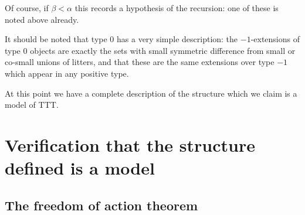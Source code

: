 \documentclass[112pt]{article}
\begin{document}
\begin{description}
Of course, if $\beta<\alpha$ this records a hypothesis of the recursion:  one of these is noted above already.


   It should be noted that type 0 has a very simple description:  the $-1$-extensions of type 0 objects are exactly the sets with small symmetric difference from small or co-small unions of litters, and that these are the same extensions over type $-1$ which appear in any positive type.


At this point we have a complete description of the structure which we claim is a model of TTT.


\end{description}

\section{Verification that the structure defined is a model}

\subsection{The freedom of action theorem}
\end{document}
